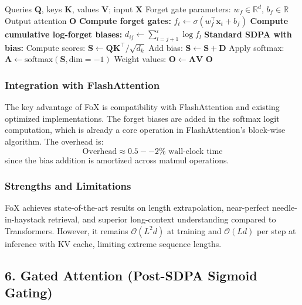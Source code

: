 \documentclass[11pt,a4paper]{article}
\begin{document}
\begin{algorithm}[H]
\caption{FoX: Forgetting Attention with Recency Bias}
\begin{algorithmic}[1]
\Require Queries $\mathbf{Q}$, keys $\mathbf{K}$, values $\mathbf{V}$; input $\mathbf{X}$
\Require Forget gate parameters: $w_f \in \mathbb{R}^d$, $b_f \in \mathbb{R}$
\Ensure Output attention $\mathbf{O}$
\State \textbf{Compute forget gates:}
    \State $f_t \gets \sigma(w_f^\top \mathbf{x}_t + b_f)$ 
\EndFor
\State \textbf{Compute cumulative log-forget biases:}
        \State $d_{ij} \gets \sum_{l=j+1}^{i} \log f_l$ 
    \EndFor
\EndFor
\State \textbf{Standard SDPA with bias:}
\State Compute scores: $\mathbf{S} \gets \mathbf{Q}\mathbf{K}^\top / \sqrt{d_k}$
\State Add bias: $\mathbf{S} \gets \mathbf{S} + \mathbf{D}$
\State Apply softmax: $\mathbf{A} \gets \text{softmax}(\mathbf{S}, \text{dim}=-1)$
\State Weight values: $\mathbf{O} \gets \mathbf{A} \mathbf{V}$
\Return $\mathbf{O}$
\end{algorithmic}
\end{algorithm}

\subsubsection{Integration with FlashAttention}

The key advantage of FoX is compatibility with FlashAttention and existing optimized implementations. The forget biases are added in the softmax logit computation, which is already a core operation in FlashAttention's block-wise algorithm. The overhead is:
\[
\text{Overhead} \approx 0.5--2\% \text{ wall-clock time}
\]
since the bias addition is amortized across matmul operations.

\subsubsection{Strengths and Limitations}

FoX achieves state-of-the-art results on length extrapolation, near-perfect needle-in-haystack retrieval, and superior long-context understanding compared to Transformers. However, it remains $\mathcal{O}(L^2 d)$ at training and $\mathcal{O}(L d)$ per step at inference with KV cache, limiting extreme sequence lengths.

\subsection{6. Gated Attention (Post-SDPA Sigmoid Gating)}
\end{document}
